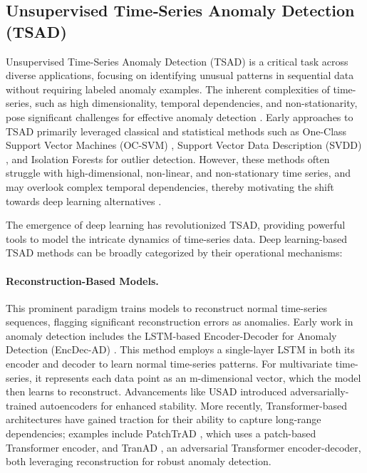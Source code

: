 \documentclass{article}
\begin{document}
\subsection{Unsupervised Time‑Series Anomaly Detection (TSAD)}
Unsupervised Time-Series Anomaly Detection (TSAD) is a critical task across diverse applications, focusing on identifying unusual patterns in sequential data without requiring labeled anomaly examples. The inherent complexities of time-series, such as high dimensionality, temporal dependencies, and non-stationarity, pose significant challenges for effective anomaly detection \citep{liu_2024_timeseries, boniol_2024_dive}.
Early approaches to TSAD primarily leveraged classical and statistical methods such as One-Class Support Vector Machines (OC-SVM) \citep{bernhard_1999_support}, Support Vector Data Description (SVDD) \citep{tax_2004_support}, and Isolation Forests \citep{feitony_2008_isolation} for outlier detection. However, these methods often struggle with high-dimensional, non-linear, and non-stationary time series, and may overlook complex temporal dependencies, thereby motivating the shift towards deep learning alternatives \citep{etikani_2024_anomaly}.

The emergence of deep learning has revolutionized TSAD, providing powerful tools to model the intricate dynamics of time-series data. Deep learning-based TSAD methods can be broadly categorized by their operational mechanisms: 
\paragraph{Reconstruction-Based Models.}
This prominent paradigm trains models to reconstruct normal time-series sequences, flagging significant reconstruction errors as anomalies. Early work in anomaly detection includes the LSTM-based Encoder-Decoder for Anomaly Detection (EncDec-AD) \citep{malhotra_ramakrishnan_anand_vig_agarwal_shroff_2016}. This method employs a single-layer LSTM in both its encoder and decoder to learn normal time-series patterns. For multivariate time-series, it represents each data point as an m-dimensional vector, which the model then learns to reconstruct. Advancements like USAD \citep{audibert_michiardi_guyard_marti_zuluaga_2020} introduced adversarially-trained autoencoders for enhanced stability. More recently, Transformer-based architectures have gained traction for their ability to capture long-range dependencies; examples include PatchTrAD \citep{vilhes_gasso_alaya_2025}, which uses a patch-based Transformer encoder, and TranAD \citep{tuli_casale_jennings_2022}, an adversarial Transformer encoder-decoder, both leveraging reconstruction for robust anomaly detection.
\end{document}
